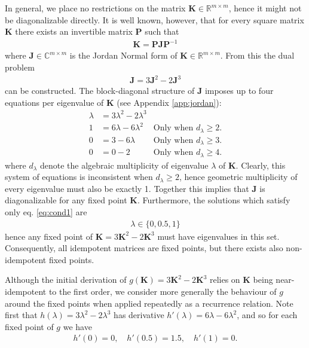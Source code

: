 \documentclass{article}
\newcommand{\vJ}{\mathbf{J}}
\newcommand{\vK}{\mathbf{K}}
\newcommand{\vP}{\mathbf{P}}
\begin{document}
In general, we place no restrictions on the matrix $\vK \in \mathbb{R}^{m \times m}$, hence it might not be diagonalizable directly. It is well known, however, that for every square matrix $\vK$ there exists an invertible matrix $\vP$ such that
\begin{align*}
  \vK = \vP \vJ \vP^{-1}
\end{align*}
where $\vJ \in \mathbb{C}^{m \times m}$ is the Jordan Normal form \cite{jordan-form} of $\vK \in \mathbb{R}^{m \times m}$. From this the dual problem
\begin{align*}
  \vJ = 3 \vJ^2 - 2 \vJ^3
\end{align*}
can be constructed. The block-diagonal structure of $\vJ$ imposes up to four equations per eigenvalue of $\vK$ (see Appendix \ref{app:jordan}):
\begin{align}
  \lambda & = 3\lambda^2 - 2\lambda^3 & \label{eq:cond1}                                   \\
  1       & = 6\lambda - 6\lambda^2   & \text{Only when $d_\lambda\geq2$.}\label{eq:cond2} \\
  0       & = 3 - 6\lambda            & \text{Only when $d_\lambda\geq3$.}\label{eq:cond3} \\
  0       & = 0 - 2                   & \text{Only when $d_\lambda\geq4$.}\label{eq:cond4}
\end{align}
where $d_\lambda$ denote the algebraic multiplicity of eigenvalue $\lambda$ of $\vK$. Clearly, this system of equations is inconsistent when $d_{\lambda} \geq 2$, hence geometric multiplicity of every eigenvalue must also be exactly 1. Together this implies that $\vJ$ is diagonalizable for any fixed point $\vK$. Furthermore, the solutions which satisfy only eq. \ref{eq:cond1} are
\begin{align*}
  \lambda \in \{0, 0.5, 1\}
\end{align*}
hence any fixed point of $\vK = 3 \vK^2 - 2 \vK^3$ must have eigenvalues in this set. Consequently, all idempotent matrices are fixed points, but there exists also non-idempotent fixed points.


Although the initial derivation of $g(\vK) = 3 \vK^2 - 2 \vK^3$ relies on $\vK$ being near-idempotent to the first order, we consider more generally the behaviour of $g$ around the fixed points when applied repeatedly as a recurrence relation. Note first that $h(\lambda) = 3\lambda^2 - 2\lambda^3$ has derivative $h'(\lambda) = 6\lambda - 6\lambda^2$, and so for each fixed point of $g$ we have
\begin{align*}
  h'(0) = 0, \quad h'(0.5) = 1.5, \quad h'(1) = 0.
\end{align*}
\end{document}
